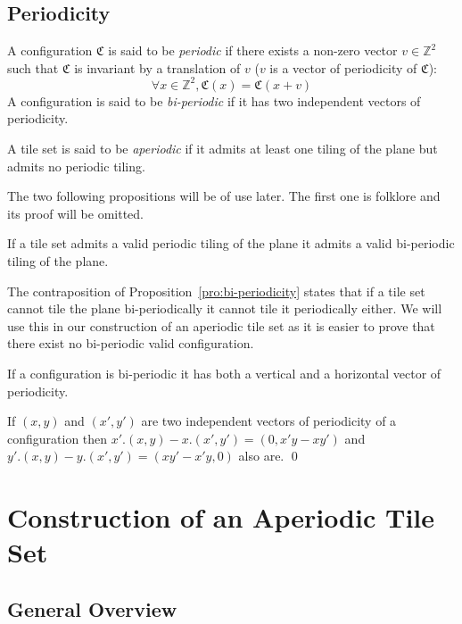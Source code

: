 \documentclass{jac}
\newcommand{\ZZ}{\mathbb{Z}}
\newcommand{\C}{\mathfrak{C}}
\begin{document}
\subsection{Periodicity}

\begin{definition}[Periodicity]\label{def:periodicity}
	A configuration $\C$ is said to be \emph{periodic} if there exists a non-zero vector $v\in\ZZ^2$ such that $\C$ is invariant by a translation of $v$ ($v$ is a vector of periodicity of $\C$):
	\[\forall x\in \ZZ^2, \C(x) = \C(x+v)\]
	A configuration is said to be \emph{bi-periodic} if it has two independent vectors of periodicity.
\end{definition}

\begin{definition}[Aperiodicity]\label{def:aperiodicity}
	A tile set is said to be \emph{aperiodic} if it admits at least one tiling of the plane but admits no periodic tiling.
\end{definition}
The two following propositions will be of use later. The first one is folklore and its proof will be omitted.

\begin{proposition}
	\label{pro:bi-periodicity}
    If a tile set admits a valid periodic tiling of the plane it admits a valid bi-periodic tiling of the plane.
\end{proposition}

\remark The contraposition of Proposition~\ref{pro:bi-periodicity} states that if a tile set cannot tile the plane bi-periodically it cannot tile it periodically either. We will use this in our construction of an aperiodic tile set as it is easier to prove that there exist no bi-periodic valid configuration.

\begin{proposition}\label{pro:vertical}
	If a configuration is bi-periodic it has both a vertical and a horizontal vector of periodicity.
\end{proposition}
\proof
If $(x,y)$ and $(x', y')$ are two independent vectors of periodicity of a configuration then $x'.(x, y) - x.(x',y') = (0, x'y - xy')$ and $y'.(x,y)-y.(x',y')=(xy'-x'y, 0)$ also are.
\qed


\section{Construction of an Aperiodic Tile Set} \label{sec:the_main_construction}

\subsection{General Overview} \label{sub:general_overview}
\end{document}

